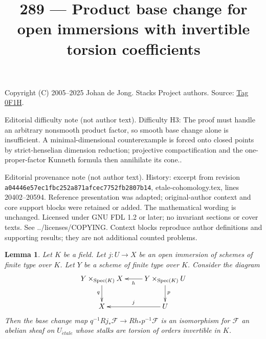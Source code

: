 \documentclass{amsart}
\theoremstyle{plain}
\newtheorem{lemma}[subsection]{Lemma}
\theoremstyle{definition}
\theoremstyle{remark}
\numberwithin{equation}{subsection}
\def\Spec{\mathop{\mathrm{Spec}}}
\def\etale{{\acute{e}tale}}
\begin{document}
\title[Stacks Project, Tag 0F1H]{289 --- Product base change for open immersions with invertible torsion coefficients}
\maketitle
\noindent Copyright (C) 2005--2025 Johan de Jong. Stacks Project authors. Source: \href{https://stacks.math.columbia.edu/tag/0F1H}{Tag 0F1H}.

\noindent Editorial difficulty note (not author text). Difficulty H3: The proof must handle an arbitrary nonsmooth product factor, so smooth base change alone is insufficient. A minimal-dimensional counterexample is forced onto closed points by strict-henselian dimension reduction; projective compactification and the one-proper-factor Kunneth formula then annihilate its cone..

\noindent Editorial provenance note (not author text). History: excerpt from revision \texttt{a0444\allowbreak 6e57e\allowbreak c1fbc\allowbreak 252a8\allowbreak 71afc\allowbreak ec775\allowbreak 2fb28\allowbreak 07b14}, etale-cohomology.tex, lines 20402--20594. Reference presentation was adapted; original-author context and core support blocks were retained or added. The mathematical wording is unchanged. Licensed under GNU FDL 1.2 or later; no invariant sections or cover texts. See ../licenses/COPYING. Context blocks reproduce author definitions and supporting results; they are not additional counted problems.

\begin{lemma}
\label{lemma-kunneth-localize-on-X}
Let $K$ be a field. Let $j : U \to X$ be an open immersion of
schemes of finite type over $K$. Let $Y$ be a scheme of finite type
over $K$. Consider the diagram
$$
\xymatrix{
Y \times_{\Spec(K)} X \ar[d]_q  &
Y \times_{\Spec(K)} U \ar[l]^h \ar[d]^p \\
X & U \ar[l]_j
}
$$
Then the base change map $q^{-1}Rj_*\mathcal{F} \to Rh_*p^{-1}\mathcal{F}$
is an isomorphism for $\mathcal{F}$ an abelian sheaf on $U_\etale$
whose stalks are torsion of orders invertible in $K$.
\end{lemma}
\end{document}
